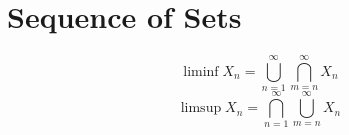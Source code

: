 \section{Sequence of Sets}
\begin{definition}
	\[ \liminf X_n = \bigcup_{n = 1}^\infty \bigcap_{m = n}^\infty X_n \]
	\[ \limsup X_n = \bigcap_{n = 1}^\infty \bigcup_{m = n}^\infty X_n \]
\end{definition}
